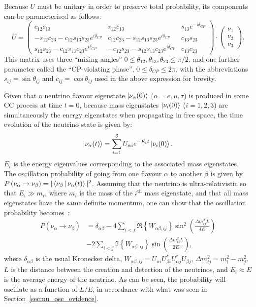 Because $U$ must be unitary in order to preserve total probability, its components can be parameterised as follows:
\begin{equation}
    U = 
    \begin{pmatrix}
        c_{12}c_{13} & s_{12}c_{13} & s_{13}e^{-i\delta_{CP}} \\
        -s_{12}c_{23}-c_{12}s_{13}s_{23}e^{i\delta_{CP}} & c_{12}c_{23}-s_{12}s_{13}s_{23}e^{i\delta_{CP}} & c_{13}s_{23} \\
        s_{12}s_{23}-c_{12}s_{13}c_{23}e^{i\delta_{CP}} & -c_{12}s_{23}-s_{12}s_{13}c_{23}e^{i\delta_{CP}} & c_{13}c_{23} 
    \end{pmatrix} \cdot 
     \begin{pmatrix}
        \nu_{1} \\ \nu_{2} \\ \nu_{3}
    \end{pmatrix}.
\end{equation}
This matrix uses three ``mixing angles'' $0\leq \theta_{12},\theta_{13},\theta_{23}\leq \pi/2$, and one further parameter called the ``CP-violating phase'', $0\leq\delta_{CP}\leq2\pi$, with the abbreviations $s_{ij}=\sin{\theta_{ij}}$ and $c_{ij}=\cos{\theta_{ij}}$ used in the above expression for brevity.

Given that a neutrino flavour eigenstate $\Ket{\nu_{\alpha}(0)}$ ($\alpha=e,\mu,\tau$) is produced in some CC process at time $t = 0$, because mass eigenstates $\Ket{\nu_{i}(0)}$ ($i=1,2,3$) are simultaneously the energy eigenstates when propagating in free space, the time evolution of the neutrino state is given by:
\begin{equation}
    \Ket{\nu_{\alpha}(t)} = \sum_{i=1}^{3}U_{\alpha i}e^{-E_{i}t}\Ket{\nu_{i}(0)}.
\end{equation}
$E_{i}$ is the energy eigenvalues corresponding to the associated mass eigenstates. The oscillation probability of going from one flavour $\alpha$ to another $\beta$ is given by $P\left(\nu_{\alpha}\to\nu_{\beta}\right) = |\Braket{\nu_{\beta} | \nu_{\alpha}(t)}|^{2}$. Assuming that the neutrino is ultra-relativistic so that $E_{i}\gg m_{i}$, where $m_{i}$ is the mass of the $i^{\mathrm{th}}$ mass eigenstate, and that all mass eigenstates have the same definite momentum, one can show that the oscillation probability becomes~\cite{}: %
\begin{align}\label{eq:nu_osc_vacuum}
    P\left(\nu_{\alpha}\to\nu_{\beta}\right) &=
        \delta_{\alpha\beta} 
        - 4\sum_{i<j}\Re\left\{W_{\alpha\beta,ij}\right\}\sin^{2}\left(\frac{\Delta m^{2}_{ij}L}{4E}\right)\nonumber\\
        &- 2\sum_{i<j}\Im\left\{W_{\alpha\beta,ij}\right\}\sin\left(\frac{\Delta m^{2}_{ij}L}{2E}\right),
\end{align}
where $\delta_{\alpha\beta}$ is the usual Kronecker delta, $W_{\alpha\beta,ij}=U_{\alpha i}U_{\beta i}^{*}U_{\alpha j}^{*}U_{\beta j}$, $\Delta m^{2}_{ij}=m^{2}_{i} - m^{2}_{j}$, $L$ is the distance between the creation and detection of the neutrinos, and $E_{i}\approx E$ is the average energy of the neutrino. As can be seen, the probability will oscillate as a function of $L/E$, in accordance with what was seen in Section~\ref{sec:nu_osc_evidence}.

